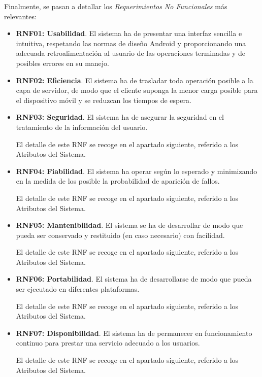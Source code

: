 Finalmente, se pasan a detallar los \emph{Requerimientos No Funcionales} más relevantes:

\begin{itemize}
	\item \textbf{RNF01: Usabilidad}. El sistema ha de presentar una interfaz sencilla e intuitiva, respetando las normas de diseño Android y proporcionando una adecuada retroalimentación al usuario de las operaciones terminadas y de posibles errores en su manejo.
	
	\item \textbf{RNF02: Eficiencia}. El sistema ha de trasladar toda operación posible a la capa de servidor, de modo que el cliente suponga la menor carga posible para el dispositivo móvil y se reduzcan los tiempos de espera.

	\item \textbf{RNF03: Seguridad}. El sistema ha de asegurar la seguridad en el tratamiento de la información del usuario. 
	
	El detalle de este RNF se recoge en el apartado siguiente, referido a los Atributos del Sistema.
	
	\item \textbf{RNF04: Fiabilidad}. El sistema ha operar según lo esperado y minimizando en la medida de los posible la probabilidad de aparición de fallos.
	
	El detalle de este RNF se recoge en el apartado siguiente, referido a los Atributos del Sistema.
	
	\item \textbf{RNF05: Mantenibilidad}. El sistema se ha de desarrollar de modo que pueda ser conservado y restituido (en caso necesario) con facilidad.
	
	El detalle de este RNF se recoge en el apartado siguiente, referido a los Atributos del Sistema.
	
	\item \textbf{RNF06: Portabilidad}. El sistema ha de desarrollarse de modo que pueda ser ejecutado en diferentes plataformas. 
	
	El detalle de este RNF se recoge en el apartado siguiente, referido a los Atributos del Sistema.
	
	\item \textbf{RNF07: Disponibilidad}. El sistema ha de permanecer en funcionamiento continuo para prestar una servicio adecuado a los usuarios.
	
	El detalle de este RNF se recoge en el apartado siguiente, referido a los Atributos del Sistema.
	
\end{itemize}

